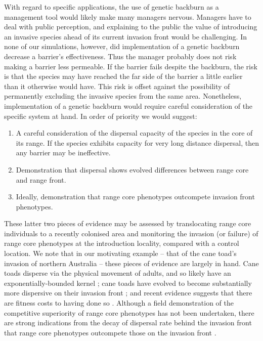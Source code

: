 \documentclass{article}
\begin{document}
With regard to specific applications, the use of genetic backburn as a management tool would likely make many managers nervous.  Managers have to deal with public perception, and explaining to the public the value of introducing an invasive species ahead of its current invasion front would be challenging.  In none of our simulations, however, did implementation of a genetic backburn decrease a barrier's effectiveness.  Thus the manager probably does not risk making a barrier less permeable.  If the barrier fails despite the backburn, the risk is that the species may have reached the far side of the barrier a little earlier than it otherwise would have.  This risk is offset against the possibility of permanently excluding the invasive species from the same area.  Nonetheless, implementation of a genetic backburn would require careful consideration of the specific system at hand. In order of priority we would suggest:
\begin{enumerate}
	\item A careful consideration of the dispersal capacity of the species in the core of its range.  If the species exhibits capacity for very long distance dispersal, then any barrier may be ineffective.
	\item Demonstration that dispersal shows evolved differences between range core and range front.
	\item Ideally, demonstration that range core phenotypes outcompete invasion front phenotypes.
\end{enumerate}

These latter two pieces of evidence may be assessed by translocating range core individuals to a recently colonised area and monitoring the invasion (or failure) of range core phenotypes at the introduction locality, compared with a control location.  We note that in our motivating example -- that of the cane toad's invasion of northern Australia -- these pieces of evidence are largely in hand.  Cane toads disperse via the physical movement of adults, and so likely have an exponentially-bounded kernel \citep[e.g.,][]{Schwarzkopf2002}; cane toads have evolved to become substantially more dispersive on their invasion front \citep{Phillips_Brown_Travis_Shine_2008, Phillips2010}; and recent evidence suggests that there are fitness costs to having done so \citep{Brown2007, Hudson2015}.  Although a field demonstration of the competitive superiority of range core phenotypes has not been undertaken, there are strong indications from the decay of dispersal rate behind the invasion front that range core phenotypes outcompete those on the invasion front \citep{Lindstrom2013, Perkins2016}.
\end{document}
